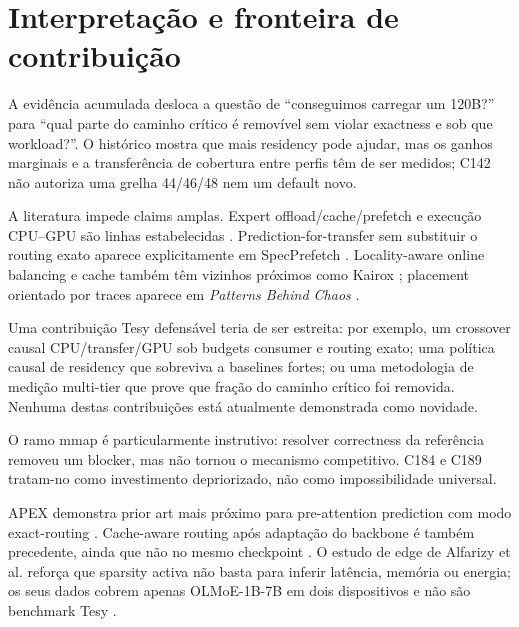 \section{Interpretação e fronteira de contribuição}
A evidência acumulada desloca a questão de “conseguimos carregar um 120B?” para “qual parte do caminho crítico é removível sem violar exactness e sob que workload?”. O histórico mostra que mais residency pode ajudar, mas os ganhos marginais e a transferência de cobertura entre perfis têm de ser medidos; C142 não autoriza uma grelha 44/46/48 nem um default novo. 

A literatura impede claims amplas. Expert offload/cache/prefetch e execução CPU--GPU são linhas estabelecidas \cite{xue2024moeinfinity,kamahori2025fiddler,chen2025ktransformers,yu2026finemoe,he2026expertflow,wang2026localslo}. Prediction-for-transfer sem substituir o routing exato aparece explicitamente em SpecPrefetch \cite{kong2026specprefetch}. Locality-aware online balancing e cache também têm vizinhos próximos como Kairox \cite{jiang2026kairox}; placement orientado por traces aparece em \emph{Patterns Behind Chaos} \cite{yu2026patterns}.

Uma contribuição Tesy defensável teria de ser estreita: por exemplo, um crossover causal CPU/transfer/GPU sob budgets consumer e routing exato; uma política causal de residency que sobreviva a baselines fortes; ou uma metodologia de medição multi-tier que prove que fração do caminho crítico foi removida. Nenhuma destas contribuições está atualmente demonstrada como novidade.

O ramo mmap é particularmente instrutivo: resolver correctness da referência removeu um blocker, mas não tornou o mecanismo competitivo. C184 e C189 tratam-no como investimento depriorizado, não como impossibilidade universal.  

APEX demonstra prior art mais próximo para pre-attention prediction com modo exact-routing \cite{kanani2026apex}. Cache-aware routing após adaptação do backbone é também precedente, ainda que não no mesmo checkpoint \cite{wu2026cacheaware}. O estudo de edge de Alfarizy et al. reforça que sparsity activa não basta para inferir latência, memória ou energia; os seus dados cobrem apenas OLMoE-1B-7B em dois dispositivos e não são benchmark Tesy \cite{alfarizy2026consumer}.
